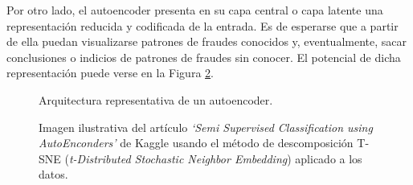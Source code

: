\documentclass[
11pt, %
]{charter}
\begin{document}
Por otro lado, el autoencoder presenta en su capa central o capa latente una representación reducida y codificada de la entrada. Es de esperarse que a partir de ella puedan visualizarse patrones de fraudes conocidos y, eventualmente, sacar conclusiones o indicios de patrones de fraudes sin conocer. El potencial de dicha representación puede verse en la Figura \ref{fig:latentRepresentation}.

\begin{figure}[H]
\centering
{}
\caption{Arquitectura representativa de un autoencoder.}
\label{fig:autoencoder}
\end{figure}

\begin{figure}[H]
\centering
{}
\hspace{0.05\textwidth}
\caption{Imagen ilustrativa del artículo \emph{‘Semi Supervised Classification using AutoEnconders’} de Kaggle usando el método de descomposición T-SNE (\emph{t-Distributed Stochastic Neighbor Embedding}) aplicado a los datos.}
\label{fig:latentRepresentation}
\end{figure}
\end{document}
